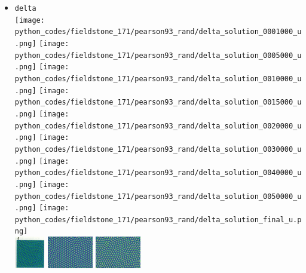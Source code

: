 \begin{itemize}
\item {\tt delta}\\
\texttt{[image: python\_codes/fieldstone\_171/pearson93\_rand/delta\_solution\_0001000\_u.png]}
\texttt{[image: python\_codes/fieldstone\_171/pearson93\_rand/delta\_solution\_0005000\_u.png]}
\texttt{[image: python\_codes/fieldstone\_171/pearson93\_rand/delta\_solution\_0010000\_u.png]}
\texttt{[image: python\_codes/fieldstone\_171/pearson93\_rand/delta\_solution\_0015000\_u.png]}
\texttt{[image: python\_codes/fieldstone\_171/pearson93\_rand/delta\_solution\_0020000\_u.png]}
\texttt{[image: python\_codes/fieldstone\_171/pearson93\_rand/delta\_solution\_0030000\_u.png]}
\texttt{[image: python\_codes/fieldstone\_171/pearson93\_rand/delta\_solution\_0040000\_u.png]}
\texttt{[image: python\_codes/fieldstone\_171/pearson93\_rand/delta\_solution\_0050000\_u.png]}
\texttt{[image: python\_codes/fieldstone\_171/pearson93\_rand/delta\_solution\_final\_u.png]}\\
\includegraphics[height=1.4cm]{python_codes/fieldstone_171/images/pear93_delta}
\includegraphics[height=1.4cm]{python_codes/fieldstone_171/images/munafo_delta1}
\includegraphics[height=1.4cm]{python_codes/fieldstone_171/images/munafo_delta2}


\end{itemize}
